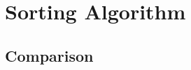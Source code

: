 \documentclass[../Main.tex]{subfiles}
\begin{document}
\chapter{Sorting Algorithm}

\intro{

}

\section{Comparison}
\end{document}
